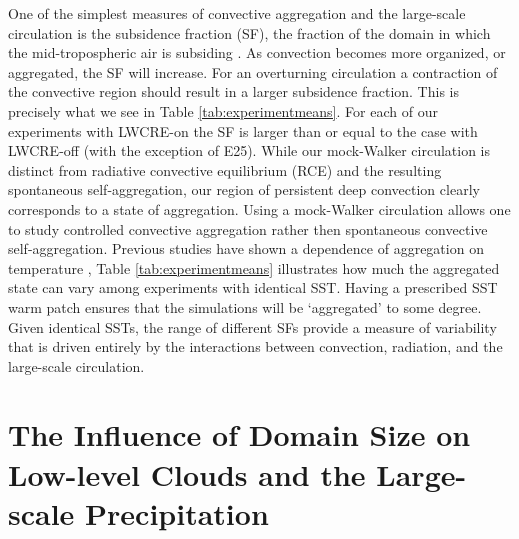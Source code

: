\documentclass[draft]{agujournal2019}
\begin{document}
One of the simplest measures of convective aggregation and the large-scale circulation is the subsidence fraction (SF), the fraction of the domain 
in which the mid-tropospheric air is subsiding \cite{Coppin_Bony_2015}.  
As convection becomes more organized, or aggregated, the SF will increase.  For an overturning circulation a contraction of the convective 
region should result in a larger subsidence fraction.  
This is precisely what we see in Table \ref{tab:experimentmeans}.  For each of our experiments with LWCRE-on the SF is larger than 
or equal to the case with LWCRE-off (with the exception of E25).   
While our mock-Walker circulation is distinct from radiative convective equilibrium (RCE) and the resulting spontaneous self-aggregation, our 
region of persistent deep convection clearly corresponds to a state of aggregation. 
Using a mock-Walker circulation allows one to study controlled convective aggregation rather then spontaneous convective self-aggregation. 
Previous studies have shown a dependence of aggregation 
on temperature \cite{Khairoutdinov2010, Wing2014, Cronin2017}, Table \ref{tab:experimentmeans} illustrates how much the aggregated 
state can vary among experiments with identical SST.  Having a prescribed SST warm 
patch ensures that the simulations will be `aggregated' to some degree.  
Given identical SSTs, the  range of different SFs provide a measure of variability that is driven entirely by the interactions between 
convection, radiation, and the large-scale circulation. 



\section{The Influence of Domain Size on Low-level Clouds and the Large-scale Precipitation}
\end{document}
